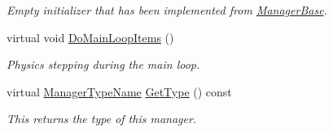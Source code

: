 \begin{DoxyCompactItemize}
\begin{DoxyCompactList}\small\item\em Empty initializer that has been implemented from \hyperlink{classphys_1_1ManagerBase}{ManagerBase}. \item\end{DoxyCompactList}\item 
virtual void \hyperlink{classphys_1_1ActorManager_abafe749a5ef6f750c6f3bbf2804c186e}{DoMainLoopItems} ()
\begin{DoxyCompactList}\small\item\em Physics stepping during the main loop. \item\end{DoxyCompactList}\item 
virtual \hyperlink{classphys_1_1ManagerBase_aaa6ccddf23892eaccb898529414f80a5}{ManagerTypeName} \hyperlink{classphys_1_1ActorManager_a7f529913ac6d7c74adfade5c383eeb25}{GetType} () const 
\begin{DoxyCompactList}\small\item\em This returns the type of this manager. \item\end{DoxyCompactList}\end{DoxyCompactItemize}
